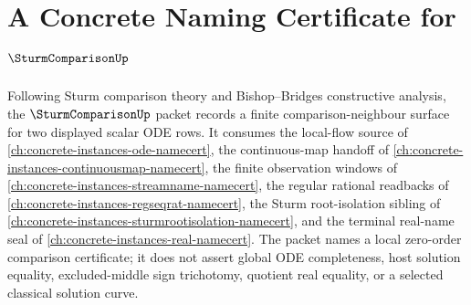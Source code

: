 \chapter{A Concrete Naming Certificate for $\SturmComparisonUp$}
\label{ch:concrete-instances-sturm-comparison-namecert}

Following Sturm comparison theory and Bishop--Bridges constructive analysis, the $\SturmComparisonUp$ packet records a finite comparison-neighbour surface for two displayed scalar ODE rows. It consumes the local-flow source of \autoref{ch:concrete-instances-ode-namecert}, the continuous-map handoff of \autoref{ch:concrete-instances-continuousmap-namecert}, the finite observation windows of \autoref{ch:concrete-instances-streamname-namecert}, the regular rational readbacks of \autoref{ch:concrete-instances-regseqrat-namecert}, the Sturm root-isolation sibling of \autoref{ch:concrete-instances-sturmrootisolation-namecert}, and the terminal real-name seal of \autoref{ch:concrete-instances-real-namecert}. The packet names a local zero-order comparison certificate; it does not assert global ODE completeness, host solution equality, excluded-middle sign trichotomy, quotient real equality, or a selected classical solution curve.

